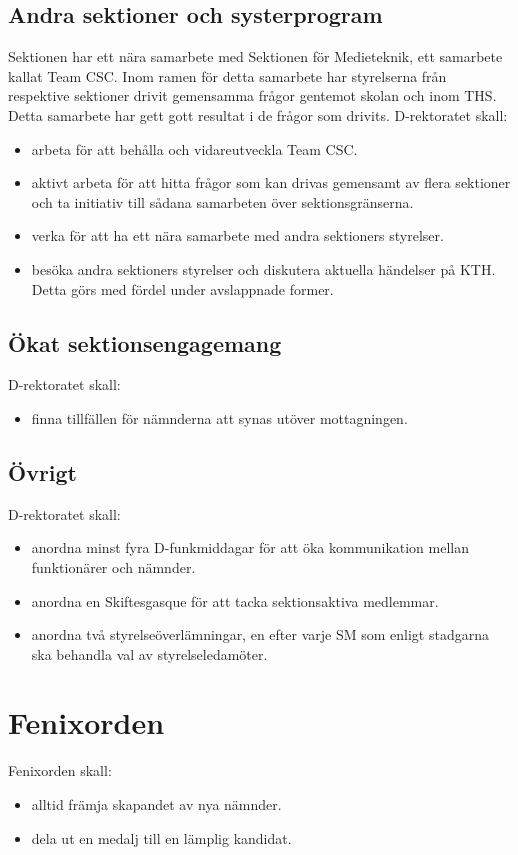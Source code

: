 \documentclass[a4paper]{article}
\begin{document}
\subsection {Andra sektioner och systerprogram}
Sektionen har ett nära samarbete med Sektionen för Medieteknik, ett samarbete kallat Team CSC. Inom ramen för detta samarbete har styrelserna från respektive sektioner drivit gemensamma frågor gentemot skolan och inom THS. Detta samarbete har gett gott resultat i de frågor som drivits.
\vspace{0.4cm}
\newline
D-rektoratet skall:
\begin{itemize}
\item arbeta för att behålla och vidareutveckla Team CSC.
\item aktivt arbeta för att hitta frågor som kan drivas gemensamt av flera sektioner och ta initiativ till sådana samarbeten över sektionsgränserna.
\item verka för att ha ett nära samarbete med andra sektioners styrelser.
\item besöka andra sektioners styrelser och diskutera aktuella händelser på KTH. Detta görs med fördel under avslappnade former.
\end{itemize}

\subsection{Ökat sektionsengagemang}
D-rektoratet skall:
\begin{itemize}
\item finna tillfällen för nämnderna att synas utöver mottagningen.
\end{itemize}

\subsection{Övrigt}
D-rektoratet skall:
\begin{itemize}
\item anordna minst fyra D-funkmiddagar för att öka kommunikation mellan funktionärer och nämnder.
\item anordna en Skiftesgasque för att tacka sektionsaktiva medlemmar.
\item anordna två styrelseöverlämningar, en efter varje SM som enligt stadgarna ska behandla val av styrelseledamöter.
\end{itemize}

\section{Fenixorden} 
Fenixorden skall:
\begin{itemize} 
\item alltid främja skapandet av nya nämnder. 
\item dela ut en medalj till en lämplig kandidat.
\end{itemize}
\end{document}
